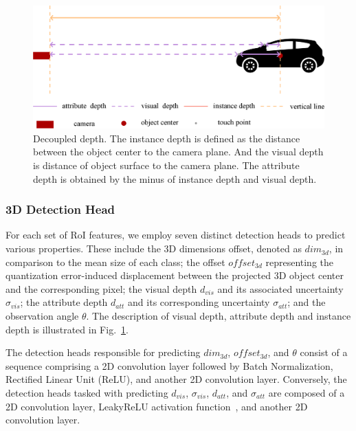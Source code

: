 \documentclass[journal]{IEEEtran}
\begin{document}
	
	
	
	
	\begin{figure}[!t]
		\centering
		\includegraphics[width=1.0\linewidth]{Figures/decoupled_depth_fig/decoupled_depth.eps}
		\caption{Decoupled depth. The instance depth is defined as the distance between the object center to the camera plane. And the visual depth is distance of object surface to the camera plane. The attribute depth is obtained by the minus of instance depth and visual depth.}
		\label{fig:decoupled depth}
	\end{figure}
	
	\subsubsection{3D Detection Head}\label{3d_detection_head}
	
	For each set of RoI features, we employ seven distinct detection heads to predict various properties. These include the 3D dimensions offset, denoted as $dim_{3d}$, in comparison to the mean size of each class; the offset $offset_{3d}$ representing the quantization error-induced displacement between the projected 3D object center and the corresponding pixel; the visual depth $d_{vis}$ and its associated uncertainty $\sigma_{vis}$; the attribute depth $d_{att}$ and its corresponding uncertainty $\sigma_{att}$; and the observation angle $\theta$. The description of visual depth, attribute depth and instance depth is illustrated in Fig.~\ref{fig:decoupled depth}. 
	
	The detection heads responsible for predicting $dim_{3d}$, $offset_{3d}$, and $\theta$ consist of a sequence comprising a 2D convolution layer followed by Batch Normalization, Rectified Linear Unit (ReLU), and another 2D convolution layer. Conversely, the detection heads tasked with predicting $d_{vis}$, $\sigma_{vis}$, $d_{att}$, and $\sigma_{att}$ are composed of a 2D convolution layer, LeakyReLU activation function~\cite{leaky-relu}, and another 2D convolution layer.
	
\end{document}
